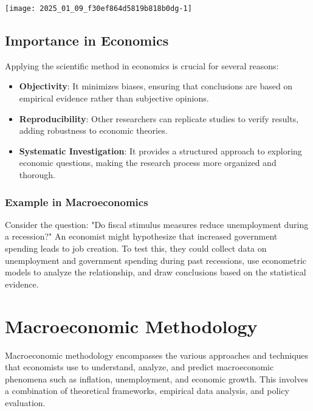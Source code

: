 \documentclass[10pt]{article}
\begin{document}
\texttt{[image: 2025\_01\_09\_f30ef864d5819b818b0dg-1]}

\subsection*{Importance in Economics}
Applying the scientific method in economics is crucial for several reasons:

\begin{itemize}
  \item \textbf{Objectivity}: It minimizes biases, ensuring that conclusions are based on empirical evidence rather than subjective opinions.
  
  \item \textbf{Reproducibility}: Other researchers can replicate studies to verify results, adding robustness to economic theories.
  
  \item \textbf{Systematic Investigation}: It provides a structured approach to exploring economic questions, making the research process more organized and thorough.
\end{itemize}

\subsubsection*{Example in Macroeconomics}
Consider the question: "Do fiscal stimulus measures reduce unemployment during a recession?" An economist might hypothesize that increased government spending leads to job creation. To test this, they could collect data on unemployment and government spending during past recessions, use econometric models to analyze the relationship, and draw conclusions based on the statistical evidence.

\section*{Macroeconomic Methodology}
Macroeconomic methodology encompasses the various approaches and techniques that economists use to understand, analyze, and predict macroeconomic phenomena such as inflation, unemployment, and economic growth. This involves a combination of theoretical frameworks, empirical data analysis, and policy evaluation.
\end{document}
